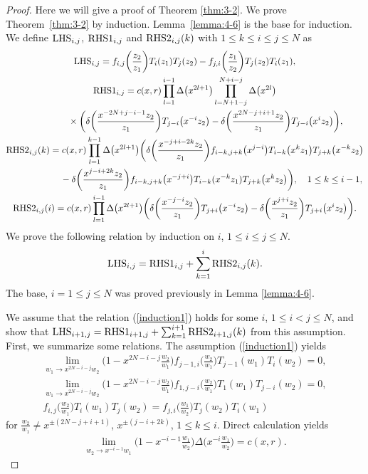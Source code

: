 \documentclass[pdftex]{sigma}
\numberwithin{equation}{section}
\begin{document}
\begin{proof}
Here we will give a proof of Theorem \ref{thm:3-2}.
We prove Theorem~\ref{thm:3-2} by induction.
Lem\-ma~\ref{lemma:4-6} is the base for induction.
We define ${\rm LHS}_{i,j}$, ${\rm RHS1}_{i,j}$ and ${\rm RHS2}_{i,j}(k)$
with $1\leq k \leq i \leq j \leq N$ as
\begin{gather*}
{\rm LHS}_{i,j}=
f_{i,j}\bigg(\frac{z_2}{z_1}\bigg)T_i(z_1)T_j(z_2)
-f_{j,i}\bigg(\frac{z_1}{z_2}\bigg)T_j(z_2)T_i(z_1),
\\
{\rm RHS1}_{i,j}=c(x,r)\prod_{l=1}^{i-1}
\Delta\big(x^{2l+1}\big)\prod_{l=N+1-j}^{N+i-j}\Delta\big(x^{2l}\big)
\\ \hphantom{{\rm RHS1}_{i,j}=}
{}\times\bigg(\delta\bigg(\frac{x^{-2N+j-i-1}z_2}{z_1}\bigg)
T_{j-i}\big(x^{-i}z_2\big)-\delta
\bigg(\frac{x^{2N-j+i+1}z_2}{z_1}\bigg)T_{j-i}\big(x^{i}z_2\big)\bigg),
\\
{\rm RHS2}_{i,j}(k)=c(x,r)\prod_{l=1}^{k-1}\Delta\big(x^{2l+1}\big)
\bigg(\delta\bigg(\frac{x^{-j+i-2k}z_2}{z_1}\bigg)
f_{i-k,j+k}\big(x^{j-i}\big)T_{i-k}\big(x^kz_1\big)T_{j+k}\big(x^{-k}z_2\big)
\\ \hphantom{{\rm RHS2}_{i,j}(k)=}
{}-\delta\bigg(\frac{x^{j-i+2k}z_2}{z_1}\bigg)f_{i-k,j+k}\big(x^{-j+i}\big)
T_{i-k}(x^{-k}z_1)T_{j+k}\big(x^{k}z_2\big)\bigg),\quad
1\leq k \leq i-1,
\\
{\rm RHS2}_{i,j}(i)=c(x,r)\prod_{l=1}^{i-1}\Delta\big(x^{2l+1}\big)
\bigg(\delta\bigg(\frac{x^{-j-i}z_2}{z_1}\bigg)T_{j+i}\big(x^{-i}z_2\big)-
\delta\bigg(\frac{x^{j+i}z_2}{z_1}\bigg)T_{j+i}\big(x^{i}z_2\big)\bigg).
\end{gather*}
We prove the following relation by induction on
$i$, $1\leq i \leq j \leq N$.
\begin{gather}
{\rm LHS}_{i,j}={\rm RHS1}_{i,j}+\sum_{k=1}^i {\rm RHS2}_{i,j}(k).
\label{induction1}
\end{gather}
The base, $i=1 \leq j \leq N$ was proved previously in
Lemma \ref{lemma:4-6}.

We assume that the relation (\ref{induction1}) holds for
some $i$, $1\leq i<j\leq N$, and show that
${\rm LHS}_{i+1,j}={\rm RHS1}_{i+1,j}+\sum_{k=1}^{i+1} {\rm RHS2}_{i+1,j}(k)$ from this assumption.
First, we summarize some relations.
The assumption (\ref{induction1}) yields
\begin{gather}
\lim_{w_1 \to x^{2N-i-j}w_2}
\bigg(1-x^{2N-i-j}\frac{w_2}{w_1}\bigg)f_{j-1,i}\bigg(\frac{w_2}{w_1}\bigg)
T_{j-1}(w_1)T_i(w_2)=0,\label{induction2}
\\
\lim_{w_1 \to x^{2N-i-j}w_2}
\bigg(1-x^{2N-i-j}\frac{w_2}{w_1}\bigg)f_{1,j-i}\bigg(\frac{w_2}{w_1}\bigg)
T_{1}(w_1)T_{j-i}(w_2)=0,\label{induction3}
\\
f_{i,j}\bigg(\frac{w_2}{w_1}\bigg)T_i(w_1)T_j(w_2)=
f_{j,i}\bigg(\frac{w_1}{w_2}\bigg)T_j(w_2)T_i(w_1)
\label{induction4}
\end{gather}
for $\frac{w_2}{w_1}\neq x^{\pm (2N-j+i+1)}$, $x^{\pm(j-i+2k)}$, $1\leq k \leq i$.
Direct calculation yields
\begin{gather}
\lim_{w_2 \to x^{-i-1}w_1}
\bigg(1-x^{-i-1}\frac{w_1}{w_2}\bigg)\Delta\bigg(x^{-i}\frac{w_1}{w_2}\bigg)=c(x,r).
\label{induction5}
\end{gather}


\end{proof}
\end{document}
